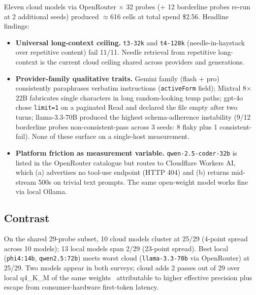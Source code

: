 \documentclass[11pt,a4paper]{article}
\begin{document}
Eleven cloud models via OpenRouter $\times$ 32 probes
(+ 12 borderline probes re-run at 2 additional seeds) produced
$\approx$616 cells at total spend \$2.56. Headline findings:

\begin{itemize}[leftmargin=*,itemsep=2pt,topsep=2pt]
\item \textbf{Universal long-context ceiling.} \texttt{t3-32k}
      and \texttt{t4-128k} (needle-in-haystack over repetitive
      content) fail 11/11. Needle retrieval from repetitive
      long-context is the current cloud ceiling shared across
      providers and generations.
\item \textbf{Provider-family qualitative traits.} Gemini
      family (flash + pro) consistently paraphrases verbatim
      instructions (\texttt{activeForm} field); Mixtral 8$\times$22B
      fabricates single characters in long random-looking temp
      paths; gpt-4o chose \texttt{limit=1} on a paginated Read
      and declared the file empty after two turns; llama-3.3-70B
      produced the highest schema-adherence instability (9/12
      borderline probes non-consistent-pass across 3 seeds: 8
      flaky plus 1 consistent-fail). None of these
      surface on a single-host measurement.
\item \textbf{Platform friction as measurement variable.}
      \texttt{qwen-2.5-coder-32b} is listed in the OpenRouter
      catalogue but routes to Cloudflare Workers AI, which
      (a) advertises no tool-use endpoint (HTTP 404) and
      (b) returns mid-stream 500s on trivial text prompts. The
      same open-weight model works fine via local Ollama.
\end{itemize}

\subsection{Contrast}

On the shared 29-probe subset, 10 cloud models cluster at
25/29 (4-point spread across 10 models); 13 local
models span 2/29 (23-point spread). Best local
(\texttt{phi4:14b}, \texttt{qwen2.5:72b}) meets worst cloud
(\texttt{llama-3.3-70b} via OpenRouter) at 25/29. Two models
appear in both surveys; cloud adds 2 passes out of
29 over local q4\_K\_M of the same weights
\textemdash\ attributable to higher effective precision plus
escape from consumer-hardware first-token latency.
\end{document}
